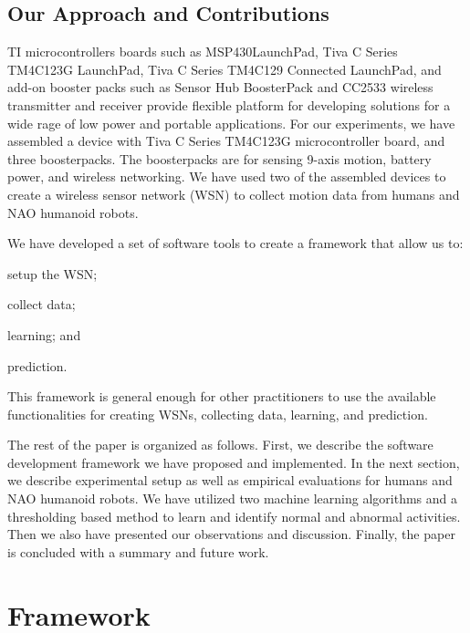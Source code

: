 \documentclass[letterpaper]{article}
\begin{document}
\begin{sloppy}
\subsection{Our Approach and Contributions}

TI microcontrollers  boards such as MSP430{\texttrademark}LaunchPad, Tiva{\texttrademark} C Series 
TM4C123G LaunchPad, Tiva C Series TM4C129 Connected LaunchPad, and add-on booster packs such as 
Sensor Hub BoosterPack and CC2533  wireless transmitter and receiver  provide flexible platform for 
developing solutions for a wide rage of low power and portable applications. For our experiments, 
we have assembled a device with Tiva C Series TM4C123G microcontroller board, and three 
boosterpacks. The boosterpacks are for sensing 9-axis motion, battery power, and wireless 
networking. We have used two of the assembled devices to create a wireless sensor network (WSN) to 
collect motion data from  humans and NAO humanoid robots.   

We have developed a set of software tools to create a framework that allow us to: 
\begin{inparaenum}[1)] \item setup the WSN; \item collect data; \item learning; and \item 
prediction. \end{inparaenum} This framework is general enough for other practitioners to use the
available functionalities for creating WSNs, collecting data, learning, and prediction.

The rest of the paper is organized as follows. First, we describe the software development 
framework we have proposed and implemented. In the next section, we describe experimental setup as 
well as empirical evaluations for humans and NAO humanoid robots. We have utilized two machine 
learning algorithms and a thresholding based method to learn and identify normal and 
abnormal activities. Then we also have presented our observations and discussion. Finally, the 
paper is concluded with a summary and future work.  

\section{Framework}


\end{sloppy}
\end{document}
